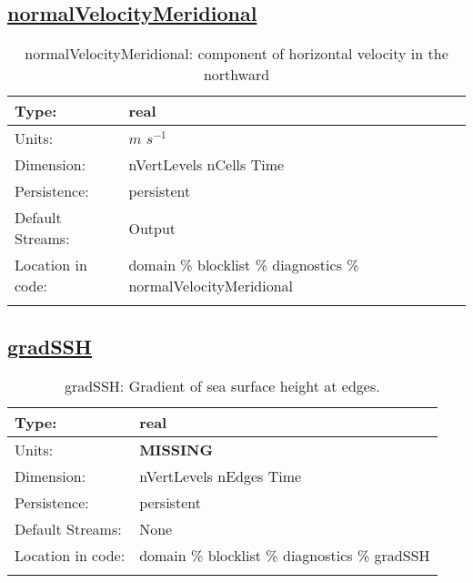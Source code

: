 \subsection[normalVelocityMeridional]{\hyperref[sec:var_tab_diagnostics]{normalVelocityMeridional}}
\label{subsec:var_sec_diagnostics_normalVelocityMeridional}
\begin{center}
\begin{longtable}{| p{2.0in} | p{4.0in} |}
        \hline 
        Type: & real \\
        \hline 
        Units: & $m$ $s^{-1}$ \\
        \hline 
        Dimension: & nVertLevels nCells Time \\
        \hline 
        Persistence: & persistent \\
        \hline 
		 Default Streams: & Output  \\
        \hline 
		 Location in code: & domain \% blocklist \% diagnostics \% normalVelocityMeridional \\
		 \hline 
    \caption{normalVelocityMeridional: component of horizontal velocity in the northward}
\end{longtable}
\end{center}
\subsection[gradSSH]{\hyperref[sec:var_tab_diagnostics]{gradSSH}}
\label{subsec:var_sec_diagnostics_gradSSH}
\begin{center}
\begin{longtable}{| p{2.0in} | p{4.0in} |}
        \hline 
        Type: & real \\
        \hline 
        Units: & {\bf \color{red} MISSING} \\
        \hline 
        Dimension: & nVertLevels nEdges Time \\
        \hline 
        Persistence: & persistent \\
        \hline 
		 Default Streams: & None \\
        \hline 
		 Location in code: & domain \% blocklist \% diagnostics \% gradSSH \\
		 \hline 
    \caption{gradSSH: Gradient of sea surface height at edges.}
\end{longtable}
\end{center}
